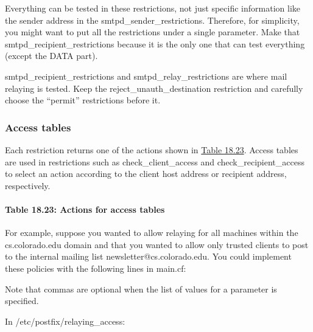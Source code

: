 
Everything can be tested in these restrictions, not just specific
information like the sender address in the
{smtpd\_sender\_restrictions}. Therefore, for simplicity, you might want
to put all the restrictions under a single parameter. Make that
{smtpd\_recipient\_restrictions }because it is the only one that can
test everything (except the DATA part).

{smtpd\_recipient\_restrictions} and {smtpd\_relay\_restrictions} are
where mail relaying is tested. Keep the {reject\_unauth\_destination}
restriction and carefully choose the ``permit'' restrictions before it.

\subsubsection[Access
tables]{\texorpdfstring{\protect\hypertarget{part0026_split_063.htmlux5cux23_idTextAnchor1191}{}{}Access
tables}{Access tables}}

Each restriction returns one of the actions shown in
\protect\hyperlink{part0026_split_063.htmlux5cux23_idTextAnchor1192}{Table
18.23}. Access tables are used in restrictions such as
{check\_client\_access} and {check\_recipient\_access} to select an
action according to the client host address or recipient address,
respectively.

\paragraph[{Table 18.23: }Actions for access
tables]{\texorpdfstring{{Table 18.23:
}\protect\hypertarget{part0026_split_063.htmlux5cux23_idTextAnchor1192}{}{}Actions
for access tables}{Table 18.23: Actions for access tables}}


For example, suppose you wanted to allow relaying for all machines
within the {cs.colorado.edu} domain and that you wanted to allow only
trusted clients to post to the internal mailing list
{newsletter@cs.colorado.edu}. You could implement these policies with
the following lines in
{main.cf}:\protect\hypertarget{part0026_split_063.htmlux5cux23_idIndexMarker2731}{}{}


Note that commas are optional when the list of values for a parameter is
specified.

In
{/}{\protect\hypertarget{part0026_split_063.htmlux5cux23_idIndexMarker2732}{}{}}{etc/postfix/relaying\_access}:

